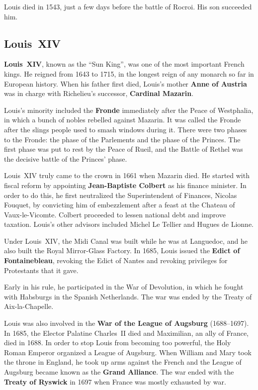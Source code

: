 Louis died in 1543, just a few days before the battle of Rocroi.
His son succeeded him.

\subsection*{Louis~XIV}

\textbf{Louis~XIV}, known as the ``Sun King'', was one of the most important French kings.
He reigned from 1643 to 1715, in the longest reign of any monarch so far in European history.
When his father first died,
Louis's mother \textbf{Anne of Austria} was in charge with Richelieu's successor, \textbf{Cardinal Mazarin}.

Louis's minority included the \textbf{Fronde} immediately after the Peace of Westphalia,
in which a bunch of nobles rebelled against Mazarin.
It was called the Fronde after the slings people used to smash windows during it.
There were two phases to the Fronde: the phase of the Parlements and the phase of the Princes.
The first phase was put to rest by the Peace of Rueil,
and the Battle of Rethel was the decisive battle of the Princes' phase.

Louis~XIV truly came to the crown in 1661 when Mazarin died.
He started with fiscal reform by appointing \textbf{Jean-Baptiste Colbert} as his finance minister.
In order to do this, he first neutralized the Superintendent of Finances, Nicolas Fouquet,
by convicting him of embezzlement after a feast at the Chateau of Vaux-le-Vicomte.
Colbert proceeded to lessen national debt and improve taxation.
Louis's other advisors included Michel Le Tellier and Hugues de Lionne.

Under Louis~XIV, the Midi Canal was built while he was at Languedoc,
and he also built the Royal Mirror-Glass Factory.
In 1685, Louis issued the \textbf{Edict of Fontainebleau},
revoking the Edict of Nantes and revoking privileges for Protestants that it gave.

Early in his rule, he participated in the War of Devolution,
in which he fought with Habsburgs in the Spanish Netherlands.
The war was ended by the Treaty of Aix-la-Chapelle.

Louis was also involved in the \textbf{War of the League of Augsburg} (1688--1697).
In 1685, the Elector Palatine Charles~II died and Maximilian, an ally of France, died in 1688.
In order to stop Louis from becoming too powerful, the Holy Roman Emperor organized a League of Augsburg.
When William and Mary took the throne in England,
he took up arms against the French and the League of Augsburg became known as the \textbf{Grand Alliance}.
The war ended with the \textbf{Treaty of Ryswick} in 1697 when France was mostly exhausted by war.

